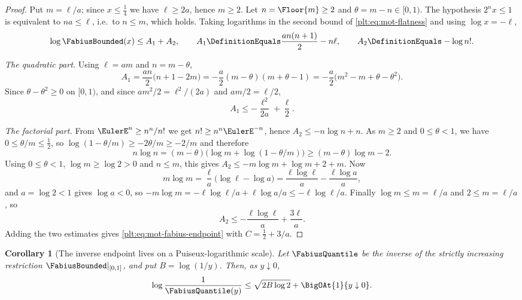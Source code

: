 \documentclass[11pt,oneside]{article}
\theoremstyle{plain}
\newtheorem{corollary}[theorem]{Corollary}
\theoremstyle{definition}
\theoremstyle{remark}
\begin{document}
\begin{proof}
Put \(m=\ell/a\); since \(x\le\tfrac14\) we have \(\ell\ge2a\), hence
\(m\ge2\).  Let \(n=\Floor{m}\ge2\) and \(\theta=m-n\in[0,1)\).  The hypothesis
\(2^{n}x\le1\) is equivalent to \(na\le\ell\), i.e.\ to \(n\le m\), which
holds.  Taking logarithms in the second bound of \eqref{plt:eq:mot-flatness}
and using \(\log x=-\ell\),
\[
  \log\FabiusBounded(x)\le A_{1}+A_{2},
  \qquad
  A_{1}\DefinitionEquals\frac{an(n+1)}{2}-n\ell,
  \qquad
  A_{2}\DefinitionEquals-\log n! .
\]

\emph{The quadratic part.}  Using \(\ell=am\) and \(n=m-\theta\),
\[
  A_{1}=\frac{an}{2}\bigl(n+1-2m\bigr)
   =-\frac{a}{2}(m-\theta)(m+\theta-1)
   =-\frac{a}{2}\bigl(m^{2}-m+\theta-\theta^{2}\bigr).
\]
Since \(\theta-\theta^{2}\ge0\) on \([0,1)\), and since
\(am^{2}/2=\ell^{2}/(2a)\) and \(am/2=\ell/2\),
\[
  A_{1}\le-\frac{\ell^{2}}{2a}+\frac{\ell}{2}.
\]

\emph{The factorial part.}  From \(\EulerE^{n}\ge n^{n}/n!\) we get
\(n!\ge n^{n}\EulerE^{-n}\), hence \(A_{2}\le-n\log n+n\).  As \(m\ge2\) and
\(0\le\theta<1\), we have \(0\le\theta/m\le\tfrac12\), so
\(\log(1-\theta/m)\ge-2\theta/m\ge-2/m\) and therefore
\[
  n\log n=(m-\theta)\bigl(\log m+\log(1-\theta/m)\bigr)
   \ge(m-\theta)\log m-2 .
\]
Using \(0\le\theta<1\), \(\log m\ge\log2>0\) and \(n\le m\), this gives
\(A_{2}\le-m\log m+\log m+2+m\).  Now
\[
  m\log m=\frac{\ell}{a}\bigl(\log\ell-\log a\bigr)
   =\frac{\ell\log\ell}{a}-\frac{\ell\log a}{a},
\]
and \(a=\log2<1\) gives \(\log a<0\), so
\(-m\log m=-\ell\log\ell/a+\ell\log a/a\le-\ell\log\ell/a\).  Finally
\(\log m\le m=\ell/a\) and \(2\le m=\ell/a\), so
\[
  A_{2}\le-\frac{\ell\log\ell}{a}+\frac{3\ell}{a}.
\]
Adding the two estimates gives \eqref{plt:eq:mot-fabius-endpoint} with
\(C=\tfrac12+3/a\).
\end{proof}

\begin{corollary}[The inverse endpoint lives on a Puiseux-logarithmic scale]
\label{plt:cor:mot-fabius-inverse}
Let \(\FabiusQuantile\) be the inverse of the strictly increasing restriction
\(\FabiusBounded|_{[0,1]}\), and put \(B=\log(1/y)\).  Then, as
\(y\downarrow0\),
\begin{equation}\label{plt:eq:mot-fabius-inverse}
  \log\frac{1}{\FabiusQuantile(y)}
  \le\sqrt{2B\log2}+\BigOAt{1}{y\downarrow0}.
\end{equation}
\end{corollary}
\end{document}

